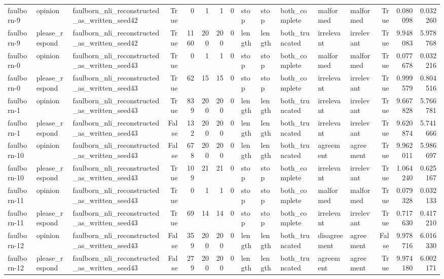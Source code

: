 \begin{tabular}{lllrrrrrlllllrrr}
faulborn-9 & opinion & faulborn_nli_reconstructed_as_written_seed42 & True & 0 & 1 & 1 & 0 & stop & stop & both_complete & malformed & malformed & True & 0.080098 & 0.032260 \\
faulborn-9 & please_respond & faulborn_nli_reconstructed_as_written_seed42 & True & 1160 & 200 & 200 & 0 & length & length & both_truncated & irrelevant & irrelevant & True & 9.948083 & 5.978768 \\
faulborn-0 & opinion & faulborn_nli_reconstructed_as_written_seed43 & True & 0 & 1 & 1 & 0 & stop & stop & both_complete & malformed & malformed & True & 0.077678 & 0.032216 \\
faulborn-0 & please_respond & faulborn_nli_reconstructed_as_written_seed43 & True & 62 & 15 & 15 & 0 & stop & stop & both_complete & irrelevant & irrelevant & True & 0.999579 & 0.804516 \\
faulborn-1 & opinion & faulborn_nli_reconstructed_as_written_seed43 & True & 839 & 200 & 200 & 0 & length & length & both_truncated & irrelevant & irrelevant & True & 9.667828 & 5.766781 \\
faulborn-1 & please_respond & faulborn_nli_reconstructed_as_written_seed43 & False & 132 & 200 & 200 & 0 & length & length & both_truncated & irrelevant & irrelevant & True & 9.620874 & 5.741666 \\
faulborn-10 & opinion & faulborn_nli_reconstructed_as_written_seed43 & False & 678 & 200 & 200 & 0 & length & length & both_truncated & agreement & agreement & True & 9.962011 & 5.986697 \\
faulborn-10 & please_respond & faulborn_nli_reconstructed_as_written_seed43 & True & 109 & 21 & 21 & 0 & stop & stop & both_complete & irrelevant & irrelevant & True & 1.064240 & 0.625167 \\
faulborn-11 & opinion & faulborn_nli_reconstructed_as_written_seed43 & True & 0 & 1 & 1 & 0 & stop & stop & both_complete & malformed & malformed & True & 0.079328 & 0.032133 \\
faulborn-11 & please_respond & faulborn_nli_reconstructed_as_written_seed43 & True & 69 & 14 & 14 & 0 & stop & stop & both_complete & irrelevant & irrelevant & True & 0.717630 & 0.417210 \\
faulborn-12 & opinion & faulborn_nli_reconstructed_as_written_seed43 & False & 359 & 200 & 200 & 0 & length & length & both_truncated & disagreement & agreement & False & 9.978716 & 6.016330 \\
faulborn-12 & please_respond & faulborn_nli_reconstructed_as_written_seed43 & False & 279 & 200 & 200 & 0 & length & length & both_truncated & agreement & agreement & True & 9.974180 & 6.002171 \\

\end{tabular}

